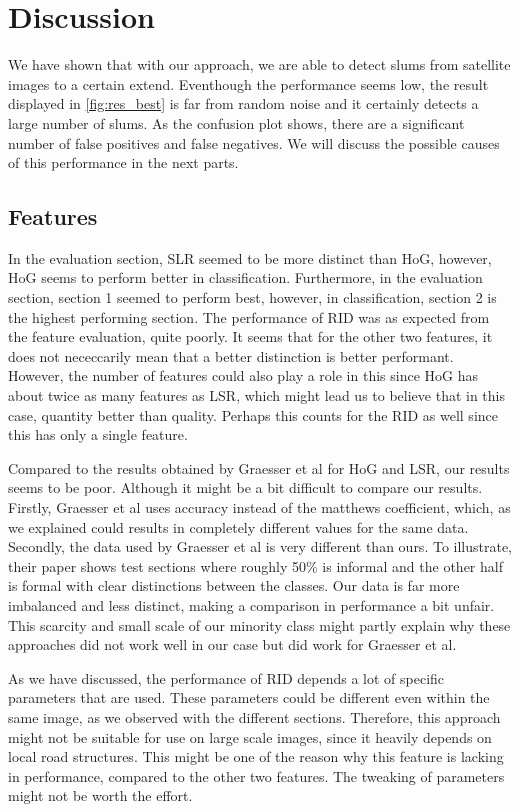 \section{Discussion}
We have shown that with our approach, we are able to detect slums from satellite images to a certain extend. Eventhough the performance seems low, the result displayed in \ref{fig:res_best} is far from random noise and it certainly detects a large number of slums. As the confusion plot shows, there are a significant number of false positives and false negatives. We will discuss the possible causes of this performance in the next parts.

\subsection{Features}
In the evaluation section, SLR seemed to be more distinct than HoG, however, HoG seems to perform better in classification. Furthermore, in the evaluation section, section 1 seemed to perform best, however, in classification, section 2 is the highest performing section. The performance of RID was as expected from the feature evaluation, quite poorly. It seems that for the other two features, it does not nececcarily mean that a better distinction is better performant. However, the number of features could also play a role in this since HoG has about twice as many features as LSR, which might lead us to believe that in this case, quantity better than quality. Perhaps this counts for the RID as well since this has only a single feature. 

Compared to the results obtained by Graesser et al for HoG and LSR, our results seems to be poor. Although it might be a bit difficult to compare our results. Firstly, Graesser et al uses accuracy instead of the matthews coefficient, which, as we explained could results in completely different values for the same data. Secondly, the data used by Graesser et al is very different than ours. To illustrate, their paper shows test sections where roughly 50\% is informal and the other half is formal with clear distinctions between the classes. Our data is far more imbalanced and less distinct, making a comparison in performance a bit unfair. This scarcity and small scale of our minority class might partly explain why these approaches did not work well in our case but did work for Graesser et al.

As we have discussed, the performance of RID depends a lot of specific parameters that are used. These parameters could be different even within the same image, as we observed with the different sections. Therefore, this approach might not be suitable for use on large scale images, since it heavily depends on local road structures. This might be one of the reason why this feature is lacking in performance, compared to the other two features. The tweaking of parameters might not be worth the effort.

